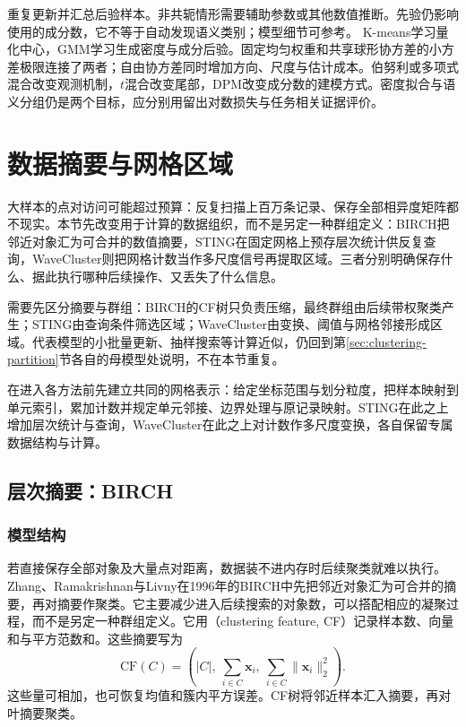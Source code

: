 重复更新并汇总后验样本。非共轭情形需要辅助参数或其他数值推断。先验仍影响使用的成分数，它不等于自动发现语义类别；模型细节可参考。
K-means学习量化中心，GMM学习生成密度与成分后验。固定均匀权重和共享球形协方差的小方差极限连接了两者；自由协方差同时增加方向、尺度与估计成本。伯努利或多项式混合改变观测机制，$t$混合改变尾部，DPM改变成分数的建模方式。密度拟合与语义分组仍是两个目标，应分别用留出对数损失与任务相关证据评价。
\section{数据摘要与网格区域}
\label{sec:clustering-summary-grid}

大样本的点对访问可能超过预算：反复扫描上百万条记录、保存全部相异度矩阵都不现实。本节先改变用于计算的数据组织，而不是另定一种群组定义：BIRCH把邻近对象汇为可合并的数值摘要，STING在固定网格上预存层次统计供反复查询，WaveCluster则把网格计数当作多尺度信号再提取区域。三者分别明确保存什么、据此执行哪种后续操作、又丢失了什么信息。

需要先区分摘要与群组：BIRCH的CF树只负责压缩，最终群组由后续带权聚类产生；STING由查询条件筛选区域；WaveCluster由变换、阈值与网格邻接形成区域。代表模型的小批量更新、抽样搜索等计算近似，仍回到第\ref{sec:clustering-partition}节各自的母模型处说明，不在本节重复。

在进入各方法前先建立共同的网格表示：给定坐标范围与划分粒度，把样本映射到单元索引，累加计数并规定单元邻接、边界处理与原记录映射。STING在此之上增加层次统计与查询，WaveCluster在此之上对计数作多尺度变换，各自保留专属数据结构与计算。

\subsection{层次摘要：BIRCH}

\subsubsection{模型结构}

若直接保存全部对象及大量点对距离，数据装不进内存时后续聚类就难以执行。Zhang、Ramakrishnan与Livny在1996年的BIRCH中先把邻近对象汇为可合并的摘要，再对摘要作聚类。它主要减少进入后续搜索的对象数，可以搭配相应的凝聚过程，而不是另定一种群组定义。它用（clustering feature, CF）记录样本数、向量和与平方范数和。这些摘要写为
\[
 \mathrm{CF}(C)=
 \left(|C|,\ \sum_{i\in C}\bm{x}_i,\
 \sum_{i\in C}\lVert\bm{x}_i\rVert_2^2\right).
\]
这些量可相加，也可恢复均值和簇内平方误差。CF树将邻近样本汇入摘要，再对叶摘要聚类。


